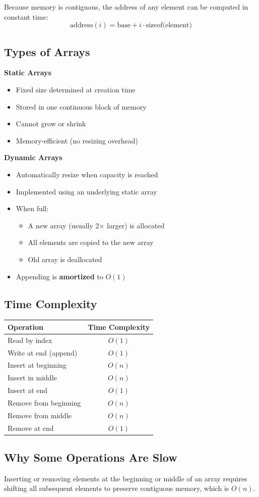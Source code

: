 Because memory is contiguous, the address of any element can be computed in constant time:
\[
\text{address}(i) = \text{base} + i \cdot \text{sizeof(element)}
\]

\subsection{Types of Arrays}

\textbf{Static Arrays}
\begin{itemize}
  \item Fixed size determined at creation time
  \item Stored in one continuous block of memory
  \item Cannot grow or shrink
  \item Memory-efficient (no resizing overhead)
\end{itemize}
\textbf{Dynamic Arrays}
\begin{itemize}
  \item Automatically resize when capacity is reached
  \item Implemented using an underlying static array
  \item When full:
    \begin{itemize}
      \item A new array (usually 2× larger) is allocated
      \item All elements are copied to the new array
      \item Old array is deallocated
    \end{itemize}
  \item Appending is \textbf{amortized} to $O(1)$
\end{itemize}

\subsection{Time Complexity}

\begin{center}
\begin{tabular}{l c}
\toprule
\textbf{Operation} & \textbf{Time Complexity} \\
\midrule
Read by index & $O(1)$ \\
Write at end (append) & $O(1)$ \\
Insert at beginning & $O(n)$ \\
Insert in middle & $O(n)$ \\
Insert at end & $O(1)$ \\
Remove from beginning & $O(n)$ \\
Remove from middle & $O(n)$ \\
Remove at end & $O(1)$ \\
\bottomrule
\end{tabular}
\end{center}

\subsection{Why Some Operations Are Slow}
Inserting or removing elements at the beginning or middle of an array requires shifting all subsequent elements to preserve contiguous memory, which is $O(n)$.